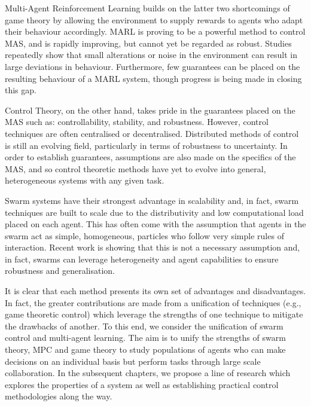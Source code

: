 \documentclass[.../main.tex]{subfiles}
\begin{document}
Multi-Agent Reinforcement Learning builds on the latter two
shortcomings of game theory by allowing the environment to supply
rewards to agents who adapt their behaviour accordingly. MARL is
proving to be a powerful method to control MAS, and is rapidly
improving, but cannot yet be regarded as robust. Studies repeatedly
show that small alterations or noise in the environment can result in
large deviations in behaviour. Furthermore, few guarantees can be
placed on the resulting behaviour of a MARL system, though progress is
being made in closing this gap.

Control Theory, on the other hand, takes pride in the guarantees
placed on the MAS such as: controllability, stability, and
robustness. However, control techniques are often centralised or
decentralised. Distributed methods of control is still an evolving
field, particularly in terms of robustness to uncertainty. In order to
establish guarantees, assumptions are also made on the specifics of
the MAS, and so control theoretic methods have yet to evolve into
general, heterogeneous systems with any given task.

Swarm systems have their strongest advantage in scalability and, in
fact, swarm techniques are built to scale due to the distributivity
and low computational load placed on each agent. This has often come
with the assumption that agents in the swarm act as simple,
homogeneous, particles who follow very simple rules of
interaction. Recent work is showing that this is not a necessary
assumption and, in fact, swarms can leverage heterogeneity and agent
capabilities to ensure robustness and generalisation.

It is clear that each method presents its own set of advantages and
disadvantages. In fact, the greater contributions are made from a
unification of techniques (e.g., game theoretic control) which leverage
the strengths of one technique to mitigate the drawbacks of
another. To this end, we consider the unification of swarm control and
multi-agent learning. The aim is to unify the strengths of swarm
theory, MPC and game theory to study populations of agents who can
make decisions on an individual basis but perform tasks through large
scale collaboration. In the subsequent chapters, we propose a line of
research which explores the properties of a system as well as
establishing practical control methodologies along the way.

\end{document}
